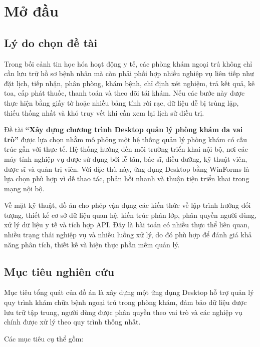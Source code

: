 \documentclass[12pt,a4paper]{article}
\numberwithin{figure}{subsection}
\numberwithin{table}{subsection}
\begin{document}
\newpage
\pagestyle{plain}
\setcounter{page}{1}

\section{Mở đầu}

\subsection{Lý do chọn đề tài}

Trong bối cảnh tin học hóa hoạt động y tế, các phòng khám ngoại trú không chỉ cần lưu trữ hồ sơ bệnh nhân mà còn phải phối hợp nhiều nghiệp vụ liên tiếp như đặt lịch, tiếp nhận, phân phòng, khám bệnh, chỉ định xét nghiệm, trả kết quả, kê toa, cấp phát thuốc, thanh toán và theo dõi tái khám. Nếu các bước này được thực hiện bằng giấy tờ hoặc nhiều bảng tính rời rạc, dữ liệu dễ bị trùng lặp, thiếu thống nhất và khó truy vết khi cần xem lại lịch sử điều trị.

Đề tài \textbf{``Xây dựng chương trình Desktop quản lý phòng khám đa vai trò''} được lựa chọn nhằm mô phỏng một hệ thống quản lý phòng khám có cấu trúc gần với thực tế. Hệ thống hướng đến môi trường triển khai nội bộ, nơi các máy tính nghiệp vụ được sử dụng bởi lễ tân, bác sĩ, điều dưỡng, kỹ thuật viên, dược sĩ và quản trị viên. Với đặc thù này, ứng dụng Desktop bằng WinForms là lựa chọn phù hợp vì dễ thao tác, phản hồi nhanh và thuận tiện triển khai trong mạng nội bộ.

Về mặt kỹ thuật, đồ án cho phép vận dụng các kiến thức về lập trình hướng đối tượng, thiết kế cơ sở dữ liệu quan hệ, kiến trúc phân lớp, phân quyền người dùng, xử lý dữ liệu y tế và tích hợp API. Đây là bài toán có nhiều thực thể liên quan, nhiều trạng thái nghiệp vụ và nhiều luồng xử lý, do đó phù hợp để đánh giá khả năng phân tích, thiết kế và hiện thực phần mềm quản lý.

\subsection{Mục tiêu nghiên cứu}

Mục tiêu tổng quát của đồ án là xây dựng một ứng dụng Desktop hỗ trợ quản lý quy trình khám chữa bệnh ngoại trú trong phòng khám, đảm bảo dữ liệu được lưu trữ tập trung, người dùng được phân quyền theo vai trò và các nghiệp vụ chính được xử lý theo quy trình thống nhất.

Các mục tiêu cụ thể gồm:
\end{document}
